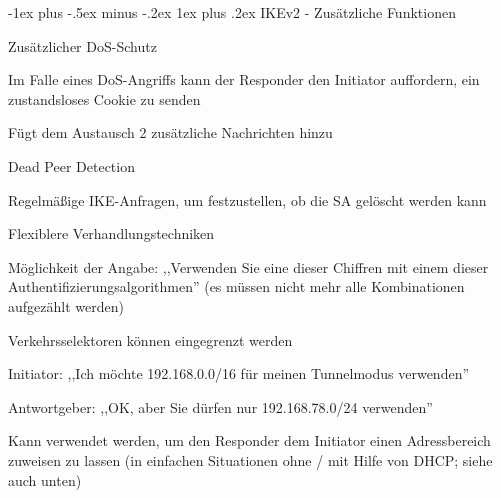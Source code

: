 \documentclass[a4paper]{article}
\makeatletter
\renewcommand{\subsubsection}{\@startsection{subsubsection}{3}{0mm}%
 {-1ex plus -.5ex minus -.2ex}%
 {1ex plus .2ex}%
 {\normalfont\small\bfseries}}
\makeatother
\begin{document}
\begin{multicols}{3}
      \subsubsection{IKEv2 - Zusätzliche Funktionen}
      \begin{itemize*}
            \item Zusätzlicher DoS-Schutz
            \begin{itemize*}
                  \item Im Falle eines DoS-Angriffs kann der Responder den Initiator auffordern, ein zustandsloses Cookie zu senden
                  \item Fügt dem Austausch 2 zusätzliche Nachrichten hinzu
            \end{itemize*}
            \item Dead Peer Detection
            \begin{itemize*}
                  \item Regelmäßige IKE-Anfragen, um festzustellen, ob die SA gelöscht werden kann
            \end{itemize*}
            \item Flexiblere Verhandlungstechniken
            \begin{itemize*}
                  \item Möglichkeit der Angabe: ,,Verwenden Sie eine dieser Chiffren mit einem dieser Authentifizierungsalgorithmen'' (es müssen nicht mehr alle Kombinationen aufgezählt werden)
                  \item Verkehrsselektoren können eingegrenzt werden
                  \begin{itemize*}
                        \item Initiator: ,,Ich möchte 192.168.0.0/16 für meinen Tunnelmodus verwenden''
                        \item Antwortgeber: ,,OK, aber Sie dürfen nur 192.168.78.0/24 verwenden''
                        \item Kann verwendet werden, um den Responder dem Initiator einen Adressbereich zuweisen zu lassen (in einfachen Situationen ohne / mit Hilfe von DHCP; siehe auch unten)
                  \end{itemize*}
            \end{itemize*}
      \end{itemize*}


\end{multicols}
\end{document}
